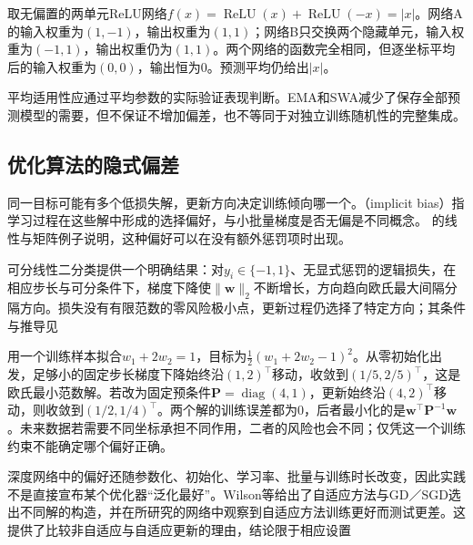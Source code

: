 \begin{example}[等价网络的参数平均可以失效]
  \label{ex:generalization-parameter-average}
  取无偏置的两单元ReLU网络$f(x)=\operatorname{ReLU}(x)+\operatorname{ReLU}(-x)=|x|$。网络A的输入权重为$(1,-1)$，输出权重为$(1,1)$；网络B只交换两个隐藏单元，输入权重为$(-1,1)$，输出权重仍为$(1,1)$。两个网络的函数完全相同，但逐坐标平均后的输入权重为$(0,0)$，输出恒为0。预测平均仍给出$|x|$。
\end{example}

平均适用性应通过平均参数的实际验证表现判断。EMA和SWA减少了保存全部预测模型的需要，但不保证不增加偏差，也不等同于对独立训练随机性的完整集成。

\subsection{优化算法的隐式偏差}
\label{sec:generalization-implicit-bias}

同一目标可能有多个低损失解，更新方向决定训练倾向哪一个。（implicit bias）指学习过程在这些解中形成的选择偏好，与小批量梯度是否无偏是不同概念。
的线性与矩阵例子说明，这种偏好可以在没有额外惩罚项时出现。

可分线性二分类提供一个明确结果：对$y_i\in\{-1,1\}$、无显式惩罚的逻辑损失，在相应步长与可分条件下，梯度下降使$\lVert\bm w\rVert_2$不断增长，方向趋向欧氏最大间隔分隔方向。损失没有有限范数的零风险极小点，更新过程仍选择了特定方向；其条件与推导见

\begin{example}[改变更新几何会改变选出的解]
  \label{ex:generalization-update-geometry}
  用一个训练样本拟合$w_1+2w_2=1$，目标为$\tfrac12(w_1+2w_2-1)^2$。从零初始化出发，足够小的固定步长梯度下降始终沿$(1,2)^{\top}$移动，收敛到$(1/5,2/5)^{\top}$，这是欧氏最小范数解。若改为固定预条件$\bm P=\operatorname{diag}(4,1)$，更新始终沿$(4,2)^{\top}$移动，则收敛到$(1/2,1/4)^{\top}$。两个解的训练误差都为0，后者最小化的是$\bm w^{\top}\bm P^{-1}\bm w$。未来数据若需要不同坐标承担不同作用，二者的风险也会不同；仅凭这一个训练约束不能确定哪个偏好正确。
\end{example}

深度网络中的偏好还随参数化、初始化、学习率、批量与训练时长改变，因此实践不是直接宣布某个优化器“泛化最好”。Wilson等给出了自适应方法与GD／SGD选出不同解的构造，并在所研究的网络中观察到自适应方法训练更好而测试更差。这提供了比较非自适应与自适应更新的理由，结论限于相应设置


